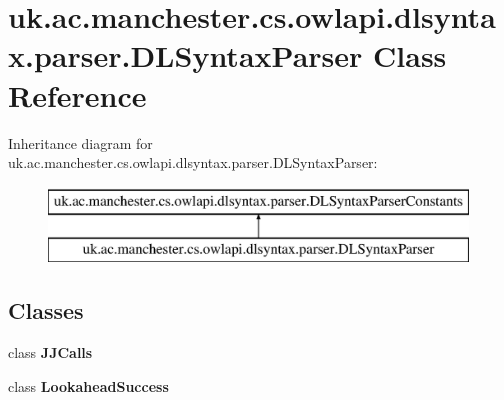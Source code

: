 \hypertarget{classuk_1_1ac_1_1manchester_1_1cs_1_1owlapi_1_1dlsyntax_1_1parser_1_1_d_l_syntax_parser}{\section{uk.\-ac.\-manchester.\-cs.\-owlapi.\-dlsyntax.\-parser.\-D\-L\-Syntax\-Parser Class Reference}
\label{classuk_1_1ac_1_1manchester_1_1cs_1_1owlapi_1_1dlsyntax_1_1parser_1_1_d_l_syntax_parser}
}
Inheritance diagram for uk.\-ac.\-manchester.\-cs.\-owlapi.\-dlsyntax.\-parser.\-D\-L\-Syntax\-Parser\-:\begin{figure}[H]
\begin{center}
\leavevmode
\includegraphics[height=2.000000cm]{classuk_1_1ac_1_1manchester_1_1cs_1_1owlapi_1_1dlsyntax_1_1parser_1_1_d_l_syntax_parser}
\end{center}
\end{figure}
\subsection*{Classes}
\begin{DoxyCompactItemize}
\item 
class {\bfseries J\-J\-Calls}
\item 
class {\bfseries Lookahead\-Success}
\end{DoxyCompactItemize}
